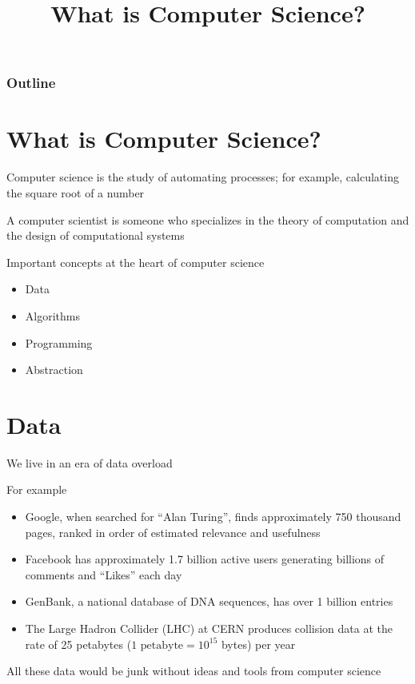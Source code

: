\documentclass[8pt,a4paper,compress]{beamer}
\title{What is Computer Science?}
\date{}
\begin{document}
\begin{frame}
\vfill
\titlepage
\end{frame}

\begin{frame}
\frametitle{Outline}
\tableofcontents
\end{frame}

\section{What is Computer Science?}
\begin{frame}[fragile]
\pause

Computer science is the study of automating processes; for example, calculating the square root of a number

\pause
\bigskip

A computer scientist is someone who specializes in the theory of computation and the design of computational systems

\pause
\bigskip

Important concepts at the heart of computer science
\begin{itemize}
\item Data
\item Algorithms
\item Programming
\item Abstraction
\end{itemize}
\end{frame}

\section{Data}
\begin{frame}[fragile]
\pause

We live in an era of data overload

\pause
\bigskip

For example
\begin{itemize}
\item Google, when searched for ``Alan Turing'', finds approximately 750 thousand pages, ranked in order of estimated relevance and usefulness 
\item Facebook has approximately 1.7 billion active users generating billions of comments and ``Likes'' each day 
\item GenBank, a national database of DNA sequences, has over 1 billion entries 
\item The Large Hadron Collider (LHC) at CERN produces collision data at the rate of 25 petabytes ($1 \text{ petabyte} = 10^{15}$ bytes) per year
\end{itemize}

\pause
\bigskip

All these data would be junk without ideas and tools from computer science
\end{frame}
\end{document}
